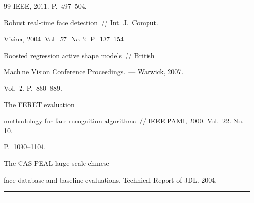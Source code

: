 {{\begin{thebibliography}{99}
IEEE, 2011. P.~497--504.







 Robust real-time face detection~/\!\!/ Int. J.~Comput. 


Vision, 2004. Vol.~57. No.\,2. P.~137--154.







 Boosted regression active shape models~/\!\!/ British 


Machine Vision Conference Proceedings.~--- Warwick, 2007. 


Vol.~2. P.~880--889.







 The FERET evaluation 


methodology for face recognition algorithms~/\!\!/ IEEE PAMI, 2000. Vol.~22. No.\,10. 


P.~1090--1104.







 The CAS-PEAL large-scale chinese 


face database and baseline evaluations. Technical Report of JDL, 2004.








\end{thebibliography}


} }








\vspace*{12pt}





\hrule





\vspace*{2pt}





\hrule





